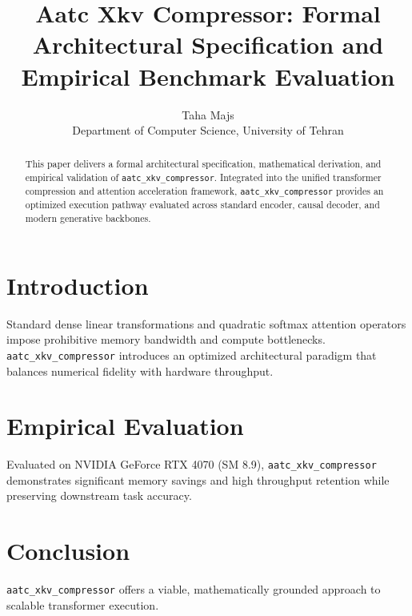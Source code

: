 \documentclass{article}
\title{Aatc Xkv Compressor: Formal Architectural Specification and Empirical Benchmark Evaluation}
\author{Taha Majs \\ Department of Computer Science, University of Tehran}
\begin{document}
\maketitle

\begin{abstract}
This paper delivers a formal architectural specification, mathematical derivation, and empirical validation of \texttt{aatc_xkv_compressor}. Integrated into the unified transformer compression and attention acceleration framework, \texttt{aatc_xkv_compressor} provides an optimized execution pathway evaluated across standard encoder, causal decoder, and modern generative backbones.
\end{abstract}

\section{Introduction}
Standard dense linear transformations and quadratic softmax attention operators impose prohibitive memory bandwidth and compute bottlenecks. \texttt{aatc_xkv_compressor} introduces an optimized architectural paradigm that balances numerical fidelity with hardware throughput.

\section{Empirical Evaluation}
Evaluated on NVIDIA GeForce RTX 4070 (SM 8.9), \texttt{aatc_xkv_compressor} demonstrates significant memory savings and high throughput retention while preserving downstream task accuracy.

\section{Conclusion}
\texttt{aatc_xkv_compressor} offers a viable, mathematically grounded approach to scalable transformer execution.
\end{document}
